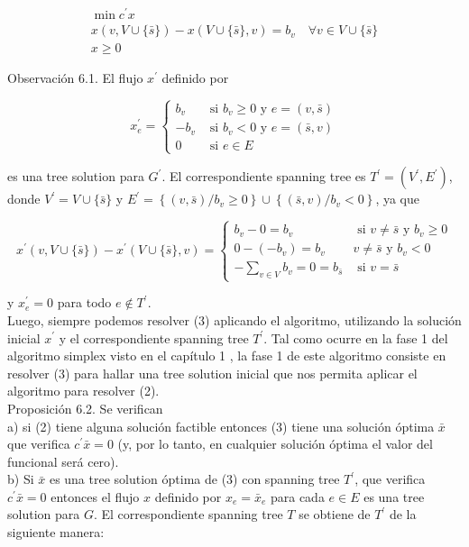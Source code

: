\documentclass[10pt]{article}
\begin{document}
\begin{gather*}
\min c^{\prime} x \\
x(v, V \cup\{\bar{s}\})-x(V \cup\{\bar{s}\}, v)=b_{v} \quad \forall v \in V \cup\{\bar{s}\}  \tag{3}\\
x \geq 0
\end{gather*}


Observación 6.1. El flujo $x^{\prime}$ definido por

$$
x_{e}^{\prime}= \begin{cases}b_{v} & \text { si } b_{v} \geq 0 \text { y } e=(v, \bar{s}) \\ -b_{v} & \text { si } b_{v}<0 \text { y } e=(\bar{s}, v) \\ 0 & \text { si } e \in E\end{cases}
$$

es una tree solution para $G^{\prime}$. El correspondiente spanning tree es $T^{\prime}=\left(V^{\prime}, E^{\prime}\right)$, donde $V^{\prime}=V \cup\{\bar{s}\}$ y $E^{\prime}=\left\{(v, \bar{s}) / b_{v} \geq 0\right\} \cup\left\{(\bar{s}, v) / b_{v}<0\right\}$, ya que

$$
x^{\prime}(v, V \cup\{\bar{s}\})-x^{\prime}(V \cup\{\bar{s}\}, v)= \begin{cases}b_{v}-0=b_{v} & \text { si } v \neq \bar{s} \text { y } b_{v} \geq 0 \\ 0-\left(-b_{v}\right)=b_{v} & v \neq \bar{s} \text { y } b_{v}<0 \\ -\sum_{v \in V} b_{v}=0=b_{\bar{s}} & \text { si } v=\bar{s}\end{cases}
$$

y $x_{e}^{\prime}=0$ para todo $e \notin T^{\prime}$.\\
Luego, siempre podemos resolver (3) aplicando el algoritmo, utilizando la solución inicial $x^{\prime}$ y el correspondiente spanning tree $T^{\prime}$. Tal como ocurre en la fase 1 del algoritmo simplex visto en el capítulo 1 , la fase 1 de este algoritmo consiste en resolver (3) para hallar una tree solution inicial que nos permita aplicar el algoritmo para resolver (2).\\
Proposición 6.2. Se verifican\\
a) si (2) tiene alguna solución factible entonces (3) tiene una solución óptima $\bar{x}$ que verifica $c^{\prime} \bar{x}=0$ (y, por lo tanto, en cualquier solución óptima el valor del funcional será cero).\\
b) Si $\bar{x}$ es una tree solution óptima de (3) con spanning tree $T^{\prime}$, que verifica $c^{\prime} \bar{x}=0$ entonces el flujo $x$ definido por $x_{e}=\bar{x}_{e}$ para cada $e \in E$ es una tree solution para $G$. El correspondiente spanning tree $T$ se obtiene de $T^{\prime}$ de la siguiente manera:
\end{document}
